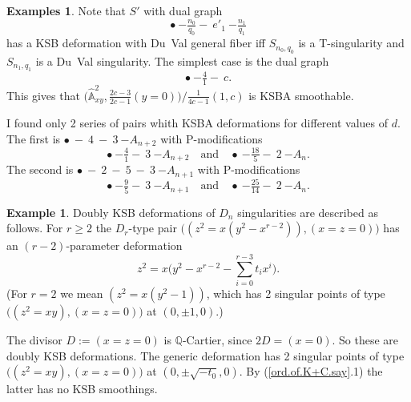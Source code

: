 \documentclass{amsart}
\theoremstyle{definition}
\newtheorem{exmp}[thm]{Example}
\newtheorem{exmps}[thm]{Examples}
\theoremstyle{remark}
\renewcommand{\a}[0]{\hat{\mathbb A}}
\newcommand{\q}[0]{{\mathbb Q}}
\newcommand{\qtq}[1]{\quad\mbox{#1}\quad}
\newcommand{\tsum}[0]{\textstyle{\sum}}
\begin{document}
   
 
     
   


    
 


\begin{exmps} \label{4.0.smooth.exmp}
  Note that $S'$ with dual graph %
$$
   \bullet \ {-\boxed{\tfrac{n_0}{q_0}}-} \  e'_1 \  {-\boxed{\tfrac{n_1}{q_1}}}
   $$
  has a KSB deformation with Du~Val general fiber iff $S_{n_0, q_0}$ is a T-singularity and
   $S_{n_1, q_1}$ is a  Du~Val singularity. 
The simplest case  is the dual graph
     $$
   \bullet\ {-\boxed{\tfrac{4}{1}}-} \  c. 
    $$
   This gives that
   $
   \bigl(\a^2_{xy},\tfrac{2c-3}{2c-1}(y=0)\bigr) /\tfrac{1}{4c-1}(1, c)
     $
   is KSBA smoothable.

   I found only 2 series of pairs whith KSBA deformations for different values of $d$. The first is
   $ \bullet\ - \ 4\ - \  3  \ {-\boxed{A_{n+2}}}$
with P-modifications 
   $$
   \bullet\ {-\boxed{\tfrac{4}{1}}-} \  3  \ {-\boxed{A_{n+2}}}
   \qtq{and} 
   \bullet\ {-\boxed{\tfrac{18}{5}}-} \  2  \ {-\boxed{A_{n}}}.
   $$
  The second is  $ \bullet\ - \ 2\ - \ 5\ - \  3  \ {-\boxed{A_{n+1}}}$
with P-modifications 
   $$
   \bullet\ {-\boxed{\tfrac{9}{5}}-} \  3  \ {-\boxed{A_{n+1}}}
   \qtq{and} 
   \bullet\ {-\boxed{\tfrac{25}{14}}-} \  2  \ {-\boxed{A_{n}}}.
   $$
   \end{exmps}



\begin{exmp} \label{D.term.QC.exmp.1} Doubly KSB deformations of $D_n$ singularities are described as follows.
  For $r\geq 2$ the $D_r$-type
  pair
  $\bigl((z^2=x(y^2-x^{r-2})), (x=z=0)\bigr)$ has an 
$(r{-}2)$-parameter deformation 
  $$
  z^2=x\bigl(y^2-x^{r-2}-\tsum_{i=0}^{r-3} t_i x^i\bigr).
  $$
  (For $r=2$ we mean $(z^2=x(y^2-1))$, which has 2 singular points of type
  $\bigl((z^2=xy), (x=z=0)\bigr)$ at $(0, \pm 1, 0)$.)
  
  The divisor  $D:=(x=z=0)$ is $\q$-Cartier, since $2D=(x=0)$.
  So these are doubly KSB deformations.
The generic deformation  has 2 singular points of type
  $\bigl((z^2=xy), (x=z=0)\bigr)$ at   $(0,\pm \sqrt{-t_0}, 0)$.
  By (\ref{ord.of.K+C.say}.1) the latter has no KSB smoothings.
  \end{exmp}
\end{document}
